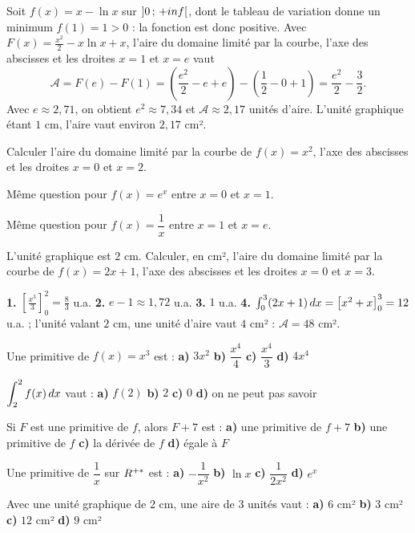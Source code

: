 \begin{exemple}
Soit $f(x) = x-\ln x$ sur $\left]0\,;\,+inf\right[$, dont le tableau de
variation donne un minimum $f(1) = 1>0$ : la fonction est donc positive.
Avec $F(x) = \frac{x^{2}}{2}-x\ln x+x$, l'aire du domaine limité par la
courbe, l'axe des abscisses et les droites $x = 1$ et $x = e$ vaut
\[
  \mathcal A = F(e)-F(1)
  = \left(\frac{e^{2}}{2}-e+e\right)-\left(\frac12-0+1\right)
  = \frac{e^{2}}{2}-\frac32 .
\]
Avec $e \approx 2{,}71$, on obtient $e^{2} \approx 7{,}34$ et
$\mathcal A \approx 2{,}17$ unités d'aire. L'unité graphique étant $1$ cm,
l'aire vaut environ $2{,}17$ cm².
\end{exemple}

\begin{entrainement}[aires]
\exo[\niveau{1}] Calculer l'aire du domaine limité par la courbe de
$f(x) = x^{2}$, l'axe des abscisses et les droites $x = 0$ et $x = 2$.

\exo[\niveau{2}] Même question pour $f(x) = e^{x}$ entre $x = 0$ et
$x = 1$.

\exo[\niveau{2}] Même question pour $f(x) = \dfrac1x$ entre $x = 1$ et
$x = e$.

\exo[\niveau{3}] L'unité graphique est $2$ cm. Calculer, en cm², l'aire du
domaine limité par la courbe de $f(x) = 2x+1$, l'axe des abscisses et les
droites $x = 0$ et $x = 3$.
\end{entrainement}

\begin{corrige}[aires]
\textbf{1.} $\left[\frac{x^{3}}{3}\right]_{0}^{2} = \frac83$ u.a.
\textbf{2.} $e-1 \approx 1{,}72$ u.a.
\textbf{3.} $1$ u.a.
\textbf{4.} $\int_{0}^{3}(2x+1)\,dx = \left[x^{2}+x\right]_{0}^{3} = 12$
u.a. ; l'unité valant $2$ cm, une unité d'aire vaut $4$ cm² :
$\mathcal A = 48$ cm².
\end{corrige}

\begin{qcm}
\exo Une primitive de $f(x) = x^{3}$ est :
\textbf{a)} $3x^{2}$ \quad \textbf{b)} $\dfrac{x^{4}}{4}$ \quad
\textbf{c)} $\dfrac{x^{4}}{3}$ \quad \textbf{d)} $4x^{4}$ 

\exo $\displaystyle\int_{2}^{2} f(x)\,dx$ vaut :
\textbf{a)} $f(2)$ \quad \textbf{b)} $2$ \quad \textbf{c)} $0$ \quad
\textbf{d)} on ne peut pas savoir 

\exo Si $F$ est une primitive de $f$, alors $F+7$ est :
\textbf{a)} une primitive de $f+7$ \quad \textbf{b)} une primitive de $f$
\quad \textbf{c)} la dérivée de $f$ \quad \textbf{d)} égale à $F$

\exo Une primitive de $\dfrac1x$ sur $R^{+*}$ est :
\textbf{a)} $-\dfrac{1}{x^{2}}$ \quad \textbf{b)} $\ln x$ \quad
\textbf{c)} $\dfrac{1}{2x^{2}}$ \quad \textbf{d)} $e^{x}$ 

\exo Avec une unité graphique de $2$ cm, une aire de $3$ unités vaut :
\textbf{a)} $6$ cm² \quad \textbf{b)} $3$ cm² \quad \textbf{c)} $12$ cm²
\quad \textbf{d)} $9$ cm² 
\end{qcm}

